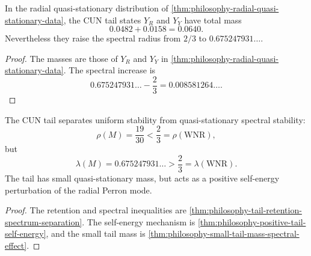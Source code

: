 \begin{theorem}
\label{thm:philosophy-small-tail-mass-spectral-effect}
In the radial quasi-stationary distribution of
\autoref{thm:philosophy-radial-quasi-stationary-data}, the CUN tail
states $Y_{R}$ and $Y_{Y}$ have total mass
$$
  0.0482+0.0158=0.0640.
$$
Nevertheless they raise the spectral radius from $2/3$ to
$0.675247931\ldots$.
\end{theorem}
\begin{proof}
The masses are those of $Y_{R}$ and $Y_{Y}$ in
\autoref{thm:philosophy-radial-quasi-stationary-data}. The spectral
increase is
$$
  0.675247931\ldots-\frac{2}{3}
  =
  0.008581264\ldots.
$$
\end{proof}

\begin{theorem}
\label{thm:philosophy-cun-spectral-antenna}
The CUN tail separates uniform stability from quasi-stationary spectral
stability:
$$
  \rho(M)=\frac{19}{30}<\frac{2}{3}=\rho(\mathrm{WNR}),
$$
but
$$
  \lambda(M)=0.675247931\ldots>\frac{2}{3}
  =\lambda(\mathrm{WNR}).
$$
The tail has small quasi-stationary mass, but acts as a positive
self-energy perturbation of the radial Perron mode.
\end{theorem}
\begin{proof}
The retention and spectral inequalities are
\autoref{thm:philosophy-tail-retention-spectrum-separation}. The
self-energy mechanism is \autoref{thm:philosophy-positive-tail-self-energy},
and the small tail mass is
\autoref{thm:philosophy-small-tail-mass-spectral-effect}.
\end{proof}

